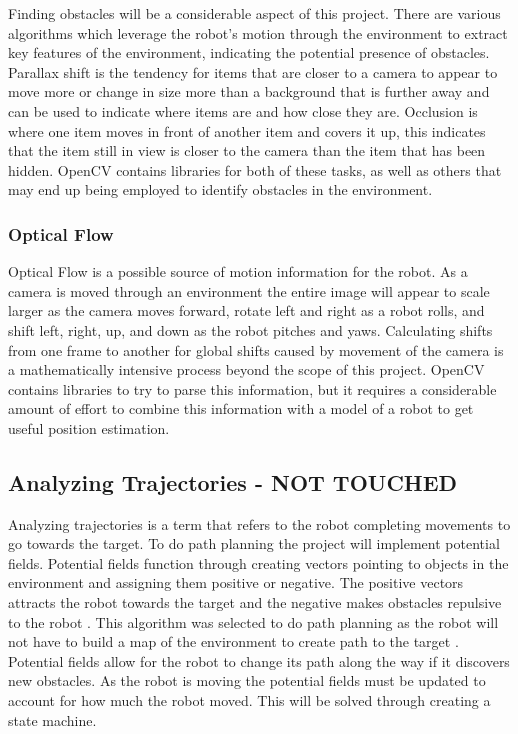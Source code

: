 \documentclass{article}
\begin{document}
		Finding obstacles will be a considerable aspect of this project. There are various algorithms which leverage the robot's motion through the environment to extract key features of the environment, indicating the potential presence of obstacles. Parallax shift is the tendency for items that are closer to a camera to appear to move more or change in size more than a background that is further away and can be used to indicate where items are and how close they are. Occlusion is where one item moves in front of another item and covers it up, this indicates that the item still in view is closer to the camera than the item that has been hidden. OpenCV contains libraries for both of these tasks, as well as others that may end up being employed to identify obstacles in the environment.
		
		\subsubsection{Optical Flow}
		
		Optical Flow is a possible source of motion information for the robot. As a camera is moved through an environment the entire image will appear to scale larger as the camera moves forward, rotate left and right as a robot rolls, and shift left, right, up, and down as the robot pitches and yaws. Calculating shifts from one frame to another for global shifts caused by movement of the camera is a mathematically intensive process beyond the scope of this project. OpenCV contains libraries to try to parse this information, but it requires a considerable amount of effort to combine this information with a model of a robot to get useful position estimation.
	
	\subsection{Analyzing Trajectories - NOT TOUCHED}
	
	Analyzing trajectories is a term that refers to the robot completing movements to go towards the target. To do path planning the project will implement potential fields. Potential fields function through creating vectors pointing to objects in the environment and assigning them positive or negative. The positive vectors attracts the robot towards the target and the negative makes obstacles repulsive to the robot \cite{hwang1992potential}. This algorithm was selected to do path planning as the robot will not have to build a map of the environment to create path to the target \cite{bortoff2000path}. Potential fields allow for the robot to change its path along the way if it discovers new obstacles. As the robot is moving the potential fields must be updated to account for how much the robot moved. This will be solved through creating a state machine. 
\end{document}
